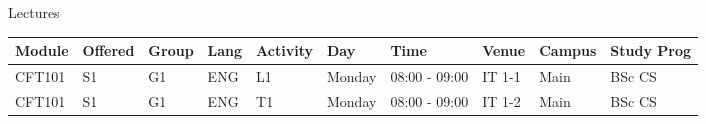 \documentclass[a4paper,landscape]{article}
\begin{document}
Lectures

\vspace{8mm}
\small
\begin{tabular}{|l|l|l|l|l|l|l|l|l|l|}
\hline
Module & Offered & Group & Lang & Activity & Day & Time & Venue & Campus & Study Prog \\
\hline
CFT101 & S1 & G1 & ENG & L1 & Monday & 08:00 - 09:00 & IT 1-1 & Main & BSc CS \\
\hline
CFT101 & S1 & G1 & ENG & T1 & Monday & 08:00 - 09:00 & IT 1-2 & Main & BSc CS \\
\hline
\end{tabular}
\end{document}
